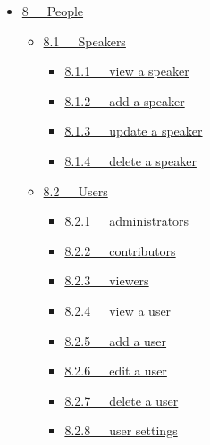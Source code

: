 \documentclass[letterpaper,10pt,english]{sphinxmanual}
\begin{document}
{\begin{minipage}{0.95\linewidth}
\begin{itemize}
\begin{itemize}
\begin{itemize}
\item {} 
{\hyperref[documentation:id19]{7.6.3   associate}}

\end{itemize}

\end{itemize}

\item {} 
{\hyperref[documentation:people]{8   People}}
\begin{itemize}
\item {} 
{\hyperref[documentation:speakers]{8.1   Speakers}}
\begin{itemize}
\item {} 
{\hyperref[documentation:view-a-speaker]{8.1.1   view a speaker}}

\item {} 
{\hyperref[documentation:add-a-speaker]{8.1.2   add a speaker}}

\item {} 
{\hyperref[documentation:update-a-speaker]{8.1.3   update a speaker}}

\item {} 
{\hyperref[documentation:delete-a-speaker]{8.1.4   delete a speaker}}

\end{itemize}

\item {} 
{\hyperref[documentation:users]{8.2   Users}}
\begin{itemize}
\item {} 
{\hyperref[documentation:administrators]{8.2.1   administrators}}

\item {} 
{\hyperref[documentation:contributors]{8.2.2   contributors}}

\item {} 
{\hyperref[documentation:viewers]{8.2.3   viewers}}

\item {} 
{\hyperref[documentation:view-a-user]{8.2.4   view a user}}

\item {} 
{\hyperref[documentation:add-a-user]{8.2.5   add a user}}

\item {} 
{\hyperref[documentation:edit-a-user]{8.2.6   edit a user}}

\item {} 
{\hyperref[documentation:delete-a-user]{8.2.7   delete a user}}

\item {} 
{\hyperref[documentation:user-settings]{8.2.8   user settings}}


\end{itemize}
\end{itemize}
\end{itemize}
\end{minipage}}
\end{document}
